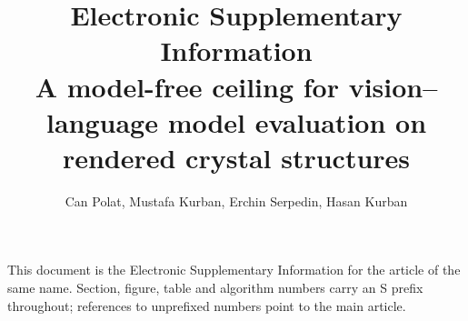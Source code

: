 \documentclass[11pt,a4paper]{article}
\title{\textbf{Electronic Supplementary Information}\\[0.4em]
A model-free ceiling for vision--language model evaluation on rendered crystal structures}
\author{Can Polat, Mustafa Kurban, Erchin Serpedin, Hasan Kurban}
\date{}
\begin{document}
\maketitle
\thispagestyle{empty}

\noindent This document is the Electronic Supplementary Information for the article of the same name.
Section, figure, table and algorithm numbers carry an S prefix throughout; references to unprefixed
numbers point to the main article.

\tableofcontents
\vspace{1em}



\end{document}
